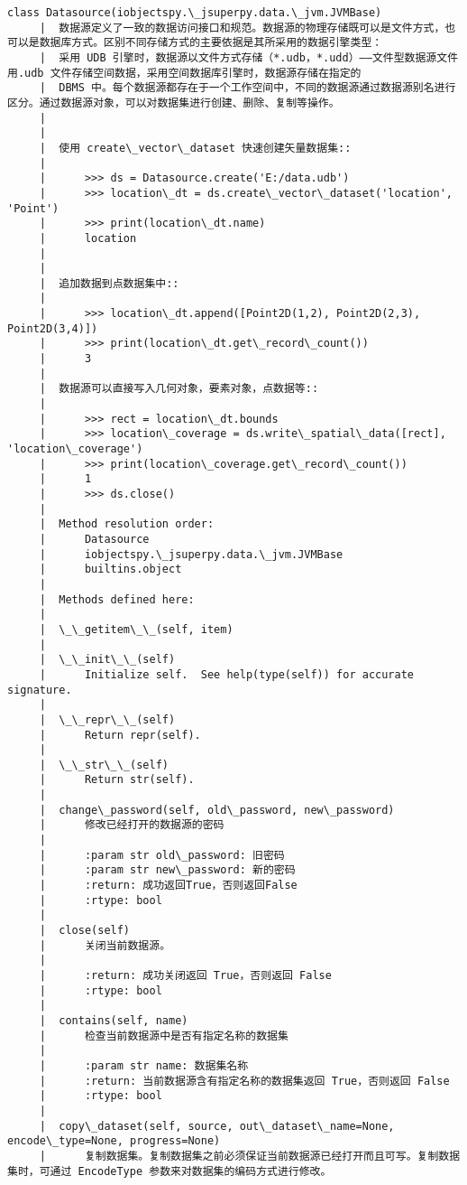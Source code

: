 \documentclass[11pt]{article}
\begin{document}
\begin{Verbatim}[commandchars=\\\{\}]
    class Datasource(iobjectspy.\_jsuperpy.data.\_jvm.JVMBase)
     |  数据源定义了一致的数据访问接口和规范。数据源的物理存储既可以是文件方式，也可以是数据库方式。区别不同存储方式的主要依据是其所采用的数据引擎类型：
     |  采用 UDB 引擎时，数据源以文件方式存储（*.udb，*.udd）——文件型数据源文件用.udb 文件存储空间数据，采用空间数据库引擎时，数据源存储在指定的
     |  DBMS 中。每个数据源都存在于一个工作空间中，不同的数据源通过数据源别名进行区分。通过数据源对象，可以对数据集进行创建、删除、复制等操作。
     |  
     |  
     |  使用 create\_vector\_dataset 快速创建矢量数据集::
     |  
     |      >>> ds = Datasource.create('E:/data.udb')
     |      >>> location\_dt = ds.create\_vector\_dataset('location', 'Point')
     |      >>> print(location\_dt.name)
     |      location
     |  
     |  
     |  追加数据到点数据集中::
     |  
     |      >>> location\_dt.append([Point2D(1,2), Point2D(2,3), Point2D(3,4)])
     |      >>> print(location\_dt.get\_record\_count())
     |      3
     |  
     |  数据源可以直接写入几何对象，要素对象，点数据等::
     |  
     |      >>> rect = location\_dt.bounds
     |      >>> location\_coverage = ds.write\_spatial\_data([rect], 'location\_coverage')
     |      >>> print(location\_coverage.get\_record\_count())
     |      1
     |      >>> ds.close()
     |  
     |  Method resolution order:
     |      Datasource
     |      iobjectspy.\_jsuperpy.data.\_jvm.JVMBase
     |      builtins.object
     |  
     |  Methods defined here:
     |  
     |  \_\_getitem\_\_(self, item)
     |  
     |  \_\_init\_\_(self)
     |      Initialize self.  See help(type(self)) for accurate signature.
     |  
     |  \_\_repr\_\_(self)
     |      Return repr(self).
     |  
     |  \_\_str\_\_(self)
     |      Return str(self).
     |  
     |  change\_password(self, old\_password, new\_password)
     |      修改已经打开的数据源的密码
     |      
     |      :param str old\_password: 旧密码
     |      :param str new\_password: 新的密码
     |      :return: 成功返回True，否则返回False
     |      :rtype: bool
     |  
     |  close(self)
     |      关闭当前数据源。
     |      
     |      :return: 成功关闭返回 True，否则返回 False
     |      :rtype: bool
     |  
     |  contains(self, name)
     |      检查当前数据源中是否有指定名称的数据集
     |      
     |      :param str name: 数据集名称
     |      :return: 当前数据源含有指定名称的数据集返回 True，否则返回 False
     |      :rtype: bool
     |  
     |  copy\_dataset(self, source, out\_dataset\_name=None, encode\_type=None, progress=None)
     |      复制数据集。复制数据集之前必须保证当前数据源已经打开而且可写。复制数据集时，可通过 EncodeType 参数来对数据集的编码方式进行修改。

\end{Verbatim}
\end{document}
